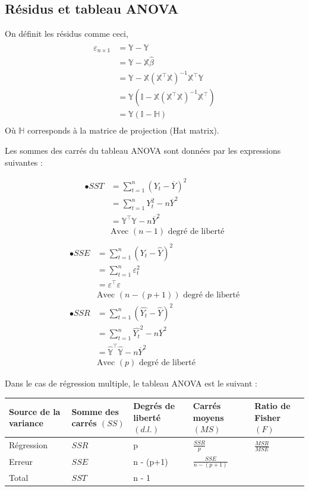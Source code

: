 \documentclass[11pt,french]{report}
\begin{document}
\subsection{Résidus et tableau ANOVA}
On définit les résidus comme ceci,
\begin{align*}
\varepsilon_{n \times 1} &= \mathbb{Y} - \hat{\mathbb{Y}} \\
&= \mathbb{Y} - \mathbb{X} \hat{\beta} \\
&= \mathbb{Y} - \mathbb{X}(\mathbb{X}^\intercal\mathbb{X})^{-1}\mathbb{X}^\intercal\mathbb{Y} \\
&= \mathbb{Y} (\mathbb{I} - \mathbb{X}(\mathbb{X}^\intercal\mathbb{X})^{-1}\mathbb{X}^\intercal) \\
&= \mathbb{Y} (\mathbb{I} - \mathbb{H}) \\
\end{align*}
Où $\mathbb{H}$ corresponds à la matrice de projection (Hat matrix).\newline

Les sommes des carrés du tableau ANOVA sont données par les expressions suivantes :

\begin{align*}
\bullet SST &= \sum_{t=1}^n(Y_t - \overline{Y})^2 \\
&= \sum_{t=1}^nY_t^2 - n\overline{Y}^2 \\
&= \mathbb{Y}^\intercal\mathbb{Y} - n \overline{Y}^2 \\
& \text{Avec $(n-1)$ degré de liberté} \\
\end{align*}
\begin{align*}
\bullet SSE &= \sum_{t=1}^n(Y_t - \hat{Y})^2 \\
&= \sum_{t=1}^n\varepsilon_t^2 \\
&= \mathbb{\varepsilon}^\intercal\mathbb{\varepsilon}\\
& \text{Avec $(n-(p+1))$ degré de liberté} \\
\bullet SSR &= \sum_{t=1}^n(\hat{Y_t} - \hat{Y})^2 \\
&= \sum_{t=1}^n\hat{Y_t}^2 - n\overline{Y}^2 \\
&= \mathbb{\hat{Y}}^\intercal\mathbb{\hat{Y}} - n \overline{Y}^2\\
& \text{Avec $(p)$ degré de liberté}
\end{align*}

\bigskip
Dans le cas de régression multiple, le tableau ANOVA est le suivant :

\bigskip
\begin{tabularx}{\linewidth}{|X|X|X|X|X|}
\hline
Source de la variance & Somme des carrés $(SS)$ & Degrés de liberté $(d.l.)$ & Carrés moyens $(MS)$ & Ratio de Fisher $(F)$ \\
\hline
Régression & $SSR$ & p & $\frac{SSR}{p}$ & $\frac{MSR}{MSE}$ \\
Erreur & $SSE$ & n - (p+1) & $ \frac{SSE}{n-(p+1)}$ & \\
\hline
Total & $SST$ & n - 1 & & \\
\hline
\end{tabularx}
\end{document}
